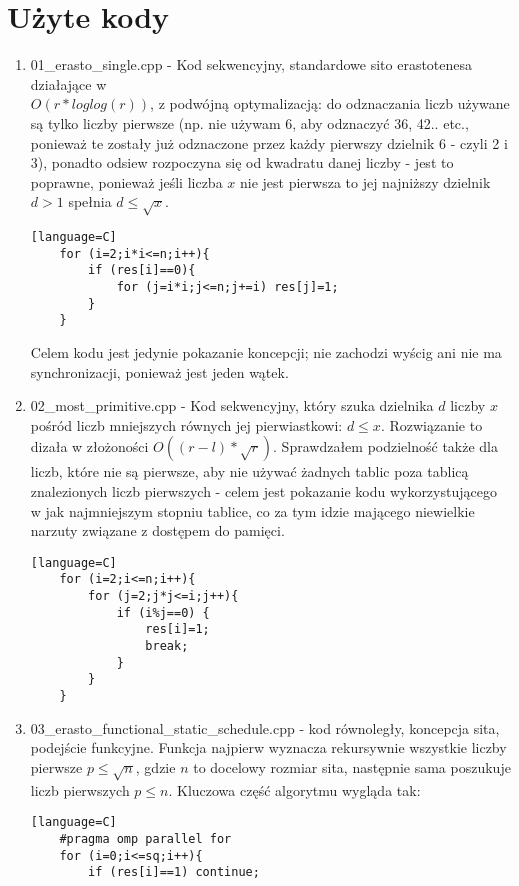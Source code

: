 \documentclass[12pt]{article}
\begin{document}
\section{Użyte kody}
\begin {enumerate}
	\item 01\_erasto\_single.cpp - Kod sekwencyjny, standardowe sito erastotenesa działające w\\ \(O(r*loglog(r))\), z podwójną optymalizacją: do odznaczania liczb używane są tylko liczby pierwsze (np. nie używam 6, aby odznaczyć 36, 42.. etc., ponieważ te zostały już odznaczone przez każdy pierwszy dzielnik 6 - czyli 2 i 3), ponadto odsiew rozpoczyna się od kwadratu danej liczby - jest to poprawne, ponieważ jeśli liczba \(x\) nie jest pierwsza to jej najniższy dzielnik \(d>1\) spełnia \(d\le \sqrt{x}\).
	\begin{lstlisting}[style=mystyle, caption= Sito Erastotenesa][language=C]
	for (i=2;i*i<=n;i++){
		if (res[i]==0){
			for (j=i*i;j<=n;j+=i) res[j]=1;
		}
	}
	\end{lstlisting}
	Celem kodu jest jedynie pokazanie koncepcji; nie zachodzi wyścig ani nie ma synchronizacji, ponieważ jest jeden wątek.
	\item 02\_most\_primitive.cpp - Kod sekwencyjny, który szuka dzielnika \(d\) liczby \(x\) pośród liczb mniejszych równych jej pierwiastkowi: \(d \le x\). Rozwiązanie to dizała w złożoności \(O((r-l)*\sqrt{r})\). Sprawdzałem podzielność także dla liczb, które nie są pierwsze, aby nie używać żadnych tablic poza tablicą znalezionych liczb pierwszych - celem jest pokazanie kodu wykorzystującego w jak najmniejszym stopniu tablice, co za tym idzie mającego niewielkie narzuty związane z dostępem do pamięci.
	\begin{lstlisting}[style=mystyle, caption= Rozwiązanie pierwiastkowe][language=C]
	for (i=2;i<=n;i++){
		for (j=2;j*j<=i;j++){
			if (i%j==0) {
				res[i]=1;
				break;
			}
		}
	}
	\end{lstlisting}
	\item 03\_erasto\_functional\_static\_schedule.cpp - kod równoległy, koncepcja sita, podejście funkcyjne. Funkcja najpierw wyznacza rekursywnie wszystkie liczby pierwsze \(p\le \sqrt{n}\), gdzie \(n\) to docelowy rozmiar sita, następnie sama poszukuje liczb pierwszych \(p\le n\). Kluczowa część algorytmu wygląda tak:
	\begin{lstlisting}[style=mystyle, caption= Sito funkcyjne ze static schedulingiem][language=C]
	#pragma omp parallel for
	for (i=0;i<=sq;i++){
		if (res[i]==1) continue;

\end{lstlisting}
\end{enumerate}
\end{document}
